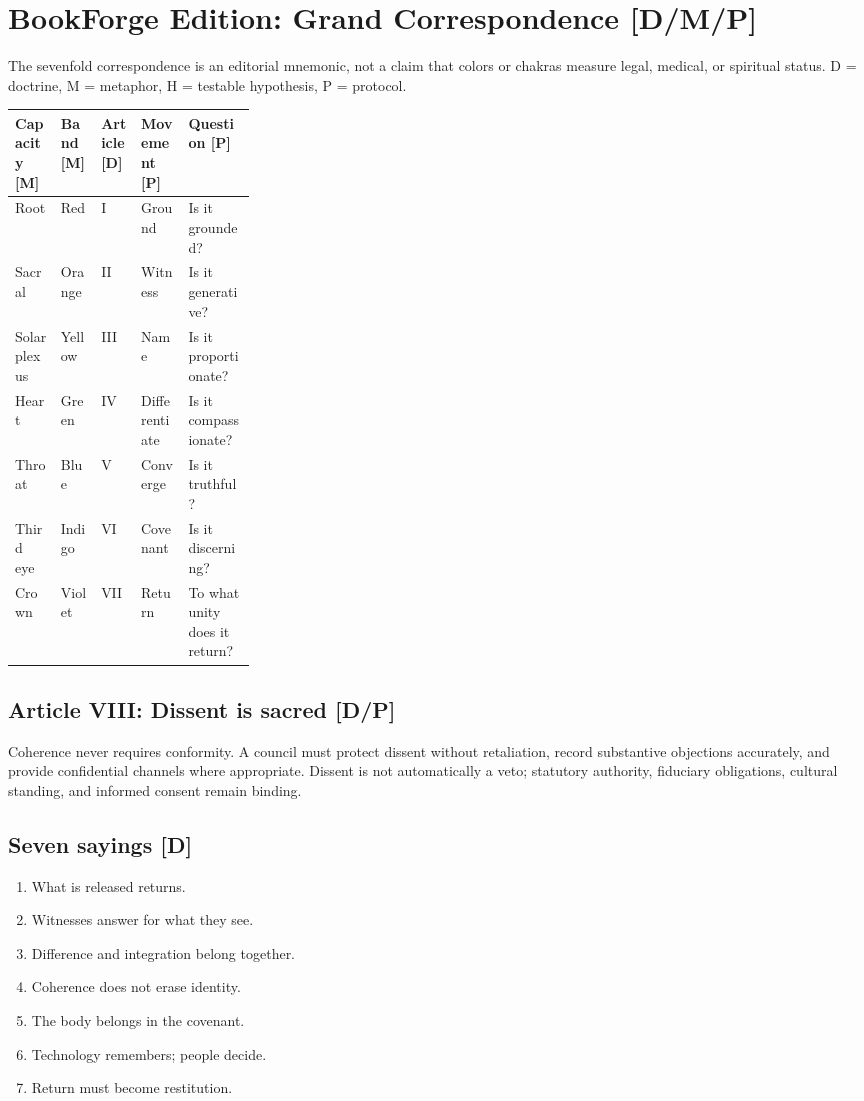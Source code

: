 \documentclass[12pt]{article}
\begin{document}
\clearpage
\section{BookForge Edition: Grand Correspondence [D/M/P]}
The sevenfold correspondence is an editorial mnemonic, not a claim that colors or chakras measure legal, medical, or spiritual status. D = doctrine, M = metaphor, H = testable hypothesis, P = protocol.
\begin{longtable}{llllp{0.28\linewidth}}
\toprule
Capacity [M] & Band [M] & Article [D] & Movement [P] & Question [P] \\
\midrule
Root & Red & I & Ground & Is it grounded? \\
Sacral & Orange & II & Witness & Is it generative? \\
Solar plexus & Yellow & III & Name & Is it proportionate? \\
Heart & Green & IV & Differentiate & Is it compassionate? \\
Throat & Blue & V & Converge & Is it truthful? \\
Third eye & Indigo & VI & Covenant & Is it discerning? \\
Crown & Violet & VII & Return & To what unity does it return? \\
\bottomrule
\end{longtable}
\subsection{Article VIII: Dissent is sacred [D/P]}
Coherence never requires conformity. A council must protect dissent without retaliation, record substantive objections accurately, and provide confidential channels where appropriate. Dissent is not automatically a veto; statutory authority, fiduciary obligations, cultural standing, and informed consent remain binding.
\subsection{Seven sayings [D]}
\begin{enumerate}
\item What is released returns.
\item Witnesses answer for what they see.
\item Difference and integration belong together.
\item Coherence does not erase identity.
\item The body belongs in the covenant.
\item Technology remembers; people decide.
\item Return must become restitution.
\end{enumerate}
\end{document}
